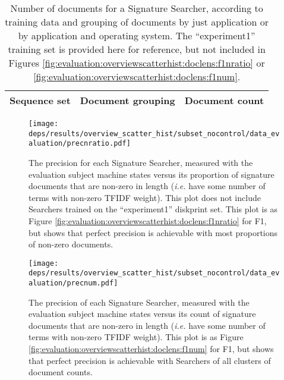 \documentclass[11pt]{ucthesis}
\theoremstyle{plain}
\theoremstyle{definition}
\newcommand{\ie}{\emph{i.e.}\xspace}
\begin{document}
\begin{table}[htp]
\begin{small}
\caption{Number of documents for a Signature Searcher, according to training data and grouping of documents by just application or by application and operating system.  The ``experiment1'' training set is provided here for reference, but not included in Figures \ref{fig:evaluation:overviewscatterhist:doclens:f1nratio} or \ref{fig:evaluation:overviewscatterhist:doclens:f1num}.}
\begin{center}
\begin{tabular}{lrr}
\toprule
Sequence set & Document grouping & Document count \\
\midrule

\bottomrule
\end{tabular}
\end{center}
\label{tbl:maxdoccounts}
\end{small}
\end{table}%

\begin{figure}
  \centering
  \texttt{[image: deps/results/overview\_scatter\_hist/subset\_nocontrol/data\_evaluation/precnratio.pdf]}
  \caption{\label{fig:evaluation:overviewscatterhist:doclens:precnratio}The precision for each Signature Searcher, measured with the evaluation subject machine states versus its proportion of signature documents that are non-zero in length (\ie have some number of terms with non-zero TFIDF weight).  This plot does not include Searchers trained on the ``experiment1'' diskprint set.  This plot is as Figure \ref{fig:evaluation:overviewscatterhist:doclens:f1nratio} for F1, but shows that perfect precision is achievable with most proportions of non-zero documents.}
\end{figure}

\begin{figure}
  \centering
  \texttt{[image: deps/results/overview\_scatter\_hist/subset\_nocontrol/data\_evaluation/precnum.pdf]}
  \caption{\label{fig:evaluation:overviewscatterhist:doclens:precnum}The precision of each Signature Searcher, measured with the evaluation subject machine states versus its count of signature documents that are non-zero in length (\ie have some number of terms with non-zero TFIDF weight).  This plot is as Figure \ref{fig:evaluation:overviewscatterhist:doclens:f1num} for F1, but shows that perfect precision is achievable with Searchers of all clusters of document counts.}
\end{figure}
\end{document}
